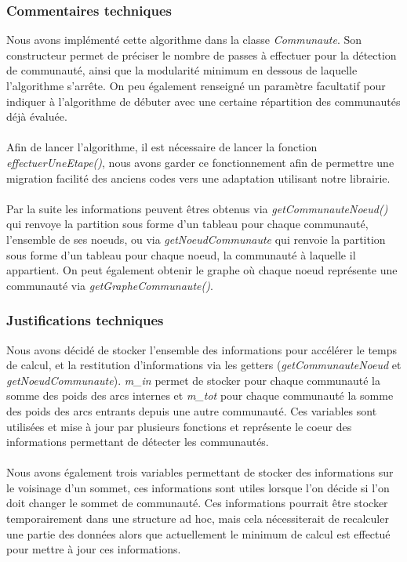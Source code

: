 \begin{titlepage}
{\subsubsection{Commentaires techniques}
{
Nous avons implémenté cette algorithme dans la classe \textit{Communaute}. Son constructeur permet de préciser le nombre de passes à effectuer pour la détection de communauté, ainsi que la modularité minimum en dessous de laquelle l'algorithme s'arrête. On peu également renseigné un paramètre facultatif pour indiquer à l'algorithme de débuter avec une certaine répartition des communautés déjà évaluée.
\\ \\ 
Afin de lancer l'algorithme, il est nécessaire de lancer la fonction \textit{effectuerUneEtape()}, nous avons garder ce fonctionnement afin de permettre une migration facilité des anciens codes vers une adaptation utilisant notre librairie.
\\ \\ 
Par la suite les informations peuvent êtres obtenus via \textit{getCommunauteNoeud()} qui renvoye la partition sous forme d'un tableau pour chaque communauté, l'ensemble de ses noeuds, ou via \textit{getNoeudCommunaute} qui renvoie la partition sous forme d'un tableau pour chaque noeud, la communauté à laquelle il appartient. On peut également obtenir le graphe où chaque noeud représente une communauté via \textit{getGrapheCommunaute()}.
}
\subsubsection{Justifications techniques}
{
Nous avons décidé de stocker l'ensemble des informations pour accélérer le temps de calcul, et la restitution d'informations via les getters (\textit{getCommunauteNoeud} et \textit{getNoeudCommunaute}). \textit{m\_in} permet de stocker pour chaque communauté la somme des poids des arcs internes et \textit{m\_tot} pour chaque communauté la somme des poids des arcs entrants depuis une autre communauté. Ces variables sont utilisées et mise à jour par plusieurs fonctions et représente le coeur des informations permettant de détecter les communautés.
\\ \\ 
Nous avons également trois variables permettant de stocker des informations sur le voisinage d'un sommet, ces informations sont utiles lorsque l'on décide si l'on doit changer le sommet de communauté. Ces informations pourrait être stocker temporairement dans une structure ad hoc, mais cela nécessiterait de recalculer une partie des données alors que actuellement le minimum de calcul est effectué pour mettre à jour ces informations.
}

}
\end{titlepage}
